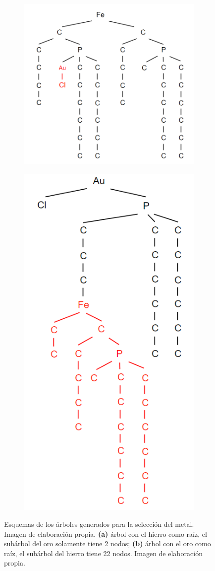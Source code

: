 \begin{figure}[h!]
\centering
\begin{subfigure}{.5\textwidth}
  \centering
  \includegraphics[width=.95\linewidth]{imagenes/diseno/canonizado/mol23Modified_Fe_raiz_resalte.png}
  \caption{}
\end{subfigure}%
\begin{subfigure}{.5\textwidth}
  \centering
  \includegraphics[width=.45\linewidth]{imagenes/diseno/canonizado/mol23Modified_Au_raiz_resalte.png}
  \caption{}
\end{subfigure}
\caption{Esquemas de los árboles generados para la selección del metal. Imagen de elaboración propia. \textbf{(a)} árbol con el hierro como raíz, el subárbol del oro solamente tiene 2 nodos; \textbf{(b)} árbol con el oro como raíz, el subárbol del hierro tiene 22 nodos. Imagen de elaboración propia.}
\label{fig:desempate_metales1}
\end{figure}



